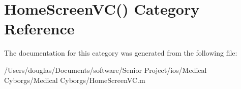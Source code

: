 \hypertarget{category_home_screen_v_c_07_08}{\section{Home\-Screen\-V\-C() Category Reference}
\label{category_home_screen_v_c_07_08}
}


The documentation for this category was generated from the following file\-:\begin{DoxyCompactItemize}
\item 
/\-Users/douglas/\-Documents/software/\-Senior Project/ios/\-Medical Cyborgs/\-Medical Cyborgs/Home\-Screen\-V\-C.\-m\end{DoxyCompactItemize}
